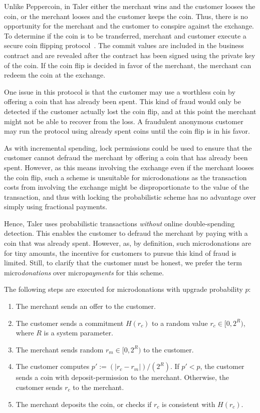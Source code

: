 \documentclass{llncs}
\begin{document}
Unlike Peppercoin, in Taler either the merchant wins and the customer
looses the coin, or the merchant looses and the customer keeps the
coin.  Thus, there is no opportunity for the merchant and the customer
to conspire against the exchange.  To determine if the coin is to be
transferred, merchant and customer execute a secure coin flipping
protocol~\cite{blum1981}.  The commit values are included in the
business contract and are revealed after the contract has been signed
using the private key of the coin.  If the coin flip is decided in
favor of the merchant, the merchant can redeem the coin at the exchange.

One issue in this protocol is that the customer may use a worthless
coin by offering a coin that has already been spent.  This kind of
fraud would only be detected if the customer actually lost the coin
flip, and at this point the merchant might not be able to recover from
the loss.  A fraudulent anonymous customer may run the protocol using
already spent coins until the coin flip is in his favor.

As with incremental spending, lock permissions could be used to ensure
that the customer cannot defraud the merchant by offering a coin that
has already been spent.  However, as this means involving the exchange
even if the merchant looses the coin flip, such a scheme is unsuitable
for microdonations as the transaction costs from involving the exchange
might be disproportionate to the value of the transaction, and thus
with locking the probabilistic scheme has no advantage over simply
using fractional payments.

Hence, Taler uses probabilistic transactions {\em without} online
double-spending detection.  This enables the customer to defraud the
merchant by paying with a coin that was already spent.  However, as,
by definition, such microdonations are for tiny amounts, the incentive
for customers to pursue this kind of fraud is limited.  Still, to
clarify that the customer must be honest, we prefer the term
micro{\em donations} over micro{\em payments} for this scheme.


The following steps are executed for microdonations with upgrade probability $p$:
\begin{enumerate}
  \item The merchant sends an offer to the customer.
  \item The customer sends a commitment $H(r_c)$ to a random
    value $r_c \in [0,2^R)$, where $R$ is a system parameter.
  \item The merchant sends random $r_m \in [0,2^R)$ to the customer.
    \item The customer computes $p' := (|r_c - r_m|) / (2^R)$.
    If $p' < p$, the customer sends a coin with deposit-permission to the merchant.
    Otherwise, the customer sends $r_c$ to the merchant.
  \item The merchant deposits the coin, or checks if $r_c$ is consistent
    with $H(r_c)$.
\end{enumerate}
\end{document}
